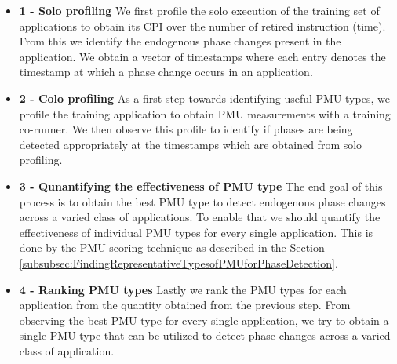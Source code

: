 \documentclass{sig-alternate}
\begin{document}
\begin{itemize}
\item \textbf{1 - Solo profiling} We first profile the solo execution of the training set of applications to obtain its CPI over the number of retired instruction (time). From this we identify the endogenous phase changes present in the application. We obtain a vector of timestamps where each entry denotes the timestamp at which a phase change occurs in an application. 

\item \textbf{2 - Colo profiling} As a first step towards identifying useful PMU types, we profile the training application to obtain PMU measurements with a training co-runner. We then observe this profile to identify if phases are being detected appropriately at the timestamps which are obtained from solo profiling. 

\item \textbf{3 - Qunantifying the effectiveness of PMU type} The end goal of this process is to obtain the best PMU type to detect endogenous phase changes across a varied class of applications. To enable that we should quantify the effectiveness of individual PMU types for every single application. This is done by the PMU scoring technique as described in the Section \ref{subsubsec:FindingRepresentativeTypesofPMUforPhaseDetection}. 

\item \textbf{4 - Ranking PMU types} Lastly we rank the PMU types  for each application from the quantity obtained from the previous step. From observing the best PMU type for every single application, we try to obtain a single PMU type that can be utilized to detect phase changes across a varied class of application. 
\end{itemize}
\end{document}
